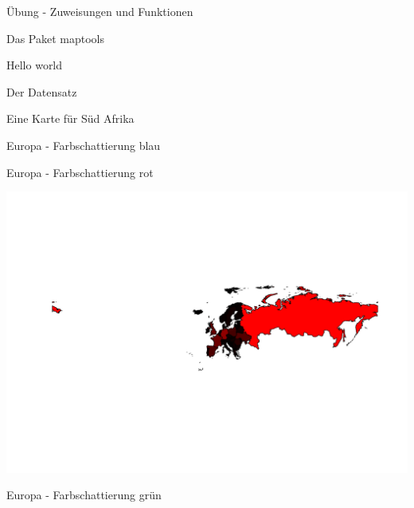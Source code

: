 \documentclass[ignorenonframetext,]{beamer}
\newenvironment{Shaded}{\begin{snugshade}}{\end{snugshade}}
\newcommand{\DataTypeTok}[1]{\textcolor[rgb]{0.74,0.68,0.62}{\underline{#1}}}
\newcommand{\DecValTok}[1]{\textcolor[rgb]{0.27,0.67,0.26}{#1}}
\newcommand{\KeywordTok}[1]{\textcolor[rgb]{0.26,0.66,0.93}{\textbf{#1}}}
\newcommand{\NormalTok}[1]{\textcolor[rgb]{0.74,0.68,0.62}{#1}}
\newcommand{\OperatorTok}[1]{\textcolor[rgb]{0.74,0.68,0.62}{#1}}
\newcommand{\StringTok}[1]{\textcolor[rgb]{0.02,0.61,0.04}{#1}}
\begin{document}
\begin{frame}[fragile]{Übung - Zuweisungen und Funktionen}
\begin{frame}[fragile]{Das Paket maptools}
\begin{frame}[fragile]{Hello world}
\begin{frame}[fragile]{Der Datensatz}
\begin{frame}[fragile]{Eine Karte für Süd Afrika}
\begin{frame}[fragile]{Europa - Farbschattierung blau}
\end{frame}

\begin{frame}[fragile]{Europa - Farbschattierung rot}
\protect\hypertarget{europa---farbschattierung-rot}{}

\begin{Shaded}
\end{Shaded}

\includegraphics{Geomedizin_files/figure-beamer/unnamed-chunk-80-1.pdf}

\end{frame}

\begin{frame}[fragile]{Europa - Farbschattierung grün}
\protect\hypertarget{europa---farbschattierung-grun}{}

\begin{Shaded}
\end{Shaded}


\end{frame}
\end{frame}
\end{frame}
\end{frame}
\end{frame}
\end{frame}
\end{document}

